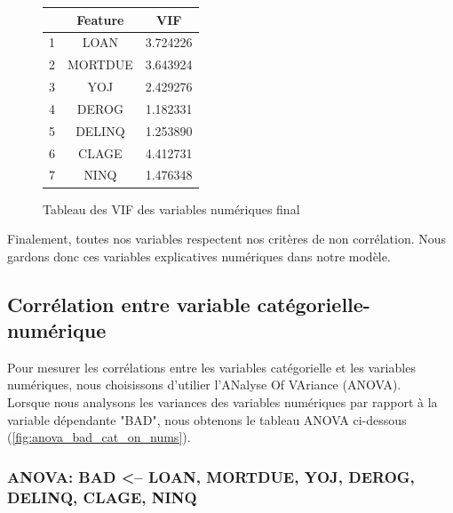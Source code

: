 \documentclass[a4paper,12pt]{report}
\begin{document}
\begin{figure}[h!]
  \begin{center}
    \begin{tabular}{||c c c||} 
     \hline
      & Feature & VIF \\ [0.5ex] 
     \hline\hline
     1 & LOAN & 3.724226 \\ 
     \hline
     2 & MORTDUE & 3.643924 \\
     \hline
     3 & YOJ & 2.429276 \\
     \hline
     4 & DEROG & 1.182331 \\
     \hline
     5 & DELINQ & 1.253890 \\
     \hline
     6 & CLAGE & 4.412731 \\
     \hline
     7 & NINQ & 1.476348 \\ [1ex] 
     \hline
    \end{tabular}
  \end{center}
  \caption{Tableau des VIF des variables numériques final}
  \label{fig:tab_vif_num_num_final}
\end{figure}

Finalement, toutes nos variables respectent nos critères de non corrélation.
Nous gardons donc ces variables explicatives numériques dans notre modèle.


\subsection{Corrélation entre variable catégorielle-numérique}

Pour mesurer les corrélations entre les variables catégorielle et les variables numériques,
nous choisissons d'utilier l'ANalyse Of VAriance (ANOVA).\\

Lorsque nous analysons les variances des variables numériques par rapport à la variable dépendante "BAD", nous obtenons le tableau ANOVA ci-dessous (\ref{fig:anova_bad_cat_on_nums}).
\subsubsection{ANOVA: BAD <-- LOAN, MORTDUE, YOJ, DEROG, DELINQ, CLAGE, NINQ}
\end{document}
